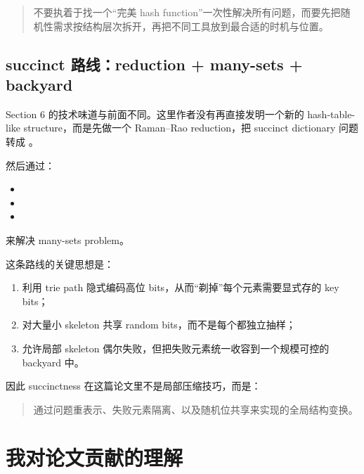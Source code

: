 \documentclass[12pt]{article}
\begin{document}
\begin{quote}不要执着于找一个“完美 hash function”一次性解决所有问题，而要先把随机性需求按结构层次拆开，再把不同工具放到最合适的时机与位置。\end{quote}

\subsection{succinct 路线：reduction + many-sets + backyard}

Section 6 的技术味道与前面不同。这里作者没有再直接发明一个新的 hash-table-like structure，而是先做一个 Raman--Rao reduction，把 succinct dictionary 问题转成 \texttt{}\cite[Sec.~6.1]{kuszmaul2022}\cite{raman2003}。

然后通过：

\begin{itemize}

\item \texttt{}

\item \texttt{}

\item \texttt{}

\end{itemize}

来解决 many-sets problem。

这条路线的关键思想是：

\begin{enumerate}

\item 利用 trie path 隐式编码高位 bits，从而“剃掉”每个元素需要显式存的 key bits；

\item 对大量小 skeleton 共享 random bits，而不是每个都独立抽样；

\item 允许局部 skeleton 偶尔失败，但把失败元素统一收容到一个规模可控的 backyard 中。

\end{enumerate}

因此 succinctness 在这篇论文里不是局部压缩技巧，而是：

\begin{quote}通过问题重表示、失败元素隔离、以及随机位共享来实现的全局结构变换。\end{quote}

\section{我对论文贡献的理解}
\end{document}
